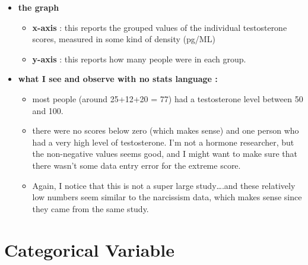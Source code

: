 \documentclass[
  letterpaper,
  DIV=11,
  numbers=noendperiod,
  oneside]{scrreprt}
\providecommand{\tightlist}{%
  \setlength{\itemsep}{0pt}\setlength{\parskip}{0pt}}\usepackage{longtable,booktabs,array}
\begin{document}
\begin{tcolorbox}[enhanced jigsaw, toptitle=1mm, toprule=.15mm, rightrule=.15mm, breakable, left=2mm, colbacktitle=quarto-callout-tip-color!10!white, colback=white, opacityback=0, coltitle=black, bottomtitle=1mm, opacitybacktitle=0.6, titlerule=0mm, leftrule=.75mm, arc=.35mm, bottomrule=.15mm, title=\textcolor{quarto-callout-tip-color}{\faLightbulb}\hspace{0.5em}{PROFESSOR SPOILERS : Expand this textbox when you are ready by clicking
on the arrow ---\textgreater{}}, colframe=quarto-callout-tip-color-frame]

\begin{itemize}
\tightlist
\item
  \textbf{the graph}

  \begin{itemize}
  \tightlist
  \item
    \textbf{x-axis} : this reports the grouped values of the individual
    testosterone scores, measured in some kind of density (pg/ML)
  \item
    \textbf{y-axis} : this reports how many people were in each group.
  \end{itemize}
\item
  \textbf{what I see and observe with no stats language :}

  \begin{itemize}
  \tightlist
  \item
    most people (around 25+12+20 = 77) had a testosterone level between
    50 and 100.
  \item
    there were no scores below zero (which makes sense) and one person
    who had a very high level of testosterone. I'm not a hormone
    researcher, but the non-negative values seems good, and I might want
    to make sure that there wasn't some data entry error for the extreme
    score.
  \item
    Again, I notice that this is not a super large study\ldots.and these
    relatively low numbers seem similar to the narcissism data, which
    makes sense since they came from the same study.
  \end{itemize}
\end{itemize}

\end{tcolorbox}

\section{Categorical Variable}\label{categorical-variable}
\end{document}
